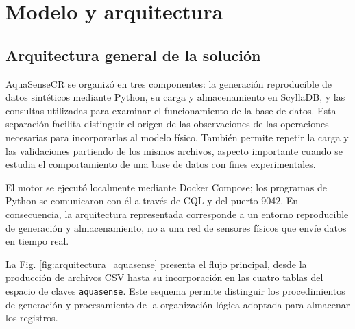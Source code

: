 \documentclass[conference]{IEEEtran}
\begin{document}
\section{Modelo y arquitectura}

\subsection{Arquitectura general de la solución}

AquaSenseCR se organizó en tres componentes: la generación reproducible de datos sintéticos mediante Python, su carga y almacenamiento en ScyllaDB, y las consultas utilizadas para examinar el funcionamiento de la base de datos. Esta separación facilita distinguir el origen de las observaciones de las operaciones necesarias para incorporarlas al modelo físico. También permite repetir la carga y las validaciones partiendo de los mismos archivos, aspecto importante cuando se estudia el comportamiento de una base de datos con fines experimentales.

El motor se ejecutó localmente mediante Docker Compose; los programas de Python se comunicaron con él a través de CQL y del puerto 9042. En consecuencia, la arquitectura representada corresponde a un entorno reproducible de generación y almacenamiento, no a una red de sensores físicos que envíe datos en tiempo real.

La Fig. \ref{fig:arquitectura_aquasense} presenta el flujo principal, desde la producción de archivos CSV hasta su incorporación en las cuatro tablas del espacio de claves \texttt{aquasense}. Este esquema permite distinguir los procedimientos de generación y procesamiento de la organización lógica adoptada para almacenar los registros.
\end{document}
